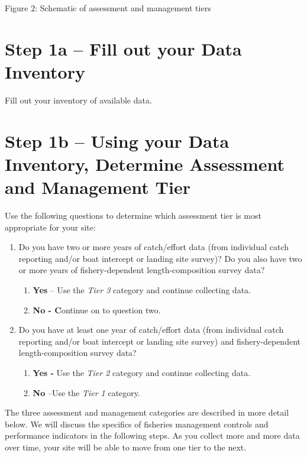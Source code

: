 \documentclass[]{book}
\begin{document}
Figure 2: Schematic of assessment and management tiers

\section{Step 1a -- Fill out your Data
Inventory}\label{step-1a-fill-out-your-data-inventory}

Fill out your inventory of available data.

\section{Step 1b -- Using your Data Inventory, Determine Assessment and
Management
Tier}\label{step-1b-using-your-data-inventory-determine-assessment-and-management-tier}

Use the following questions to determine which assessment tier is most
appropriate for your site:

\begin{enumerate}
\def\labelenumi{\arabic{enumi}.}
\item
  Do you have two or more years of catch/effort data (from individual
  catch reporting and/or boat intercept or landing site survey)? Do you
  also have two or more years of fishery-dependent length-composition
  survey data?

  \begin{enumerate}
  \def\labelenumii{\alph{enumii}.}
  \item
    \textbf{Yes} -- Use the \emph{Tier 3} category and continue
    collecting data.
  \item
    \textbf{No - C}ontinue on to question two.
  \end{enumerate}
\item
  Do you have at least one year of catch/effort data (from individual
  catch reporting and/or boat intercept or landing site survey) and
  fishery-dependent length-composition survey data?

  \begin{enumerate}
  \def\labelenumii{\alph{enumii}.}
  \item
    \textbf{Yes -} Use the \emph{Tier 2} category and continue
    collecting data.
  \item
    \textbf{No} --Use the \emph{Tier 1} category.
  \end{enumerate}
\end{enumerate}

The three assessment and management categories are described in more
detail below. We will discuss the specifics of fisheries management
controls and performance indicators in the following steps. As you
collect more and more data over time, your site will be able to move
from one tier to the next.
\end{document}
